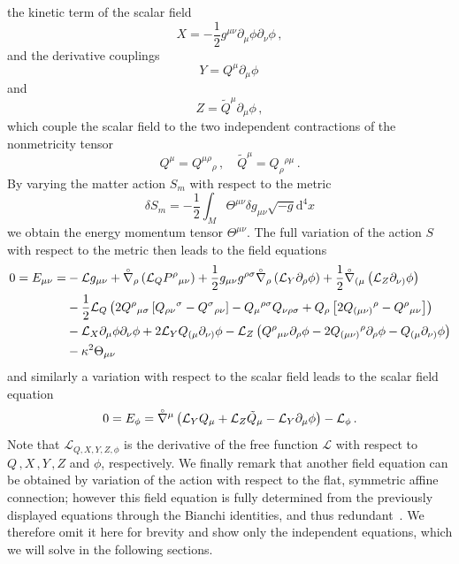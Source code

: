\documentclass[notitlepage,a4paper,aps,prd,onecolumn,superscriptaddress,nofootinbib,groupedaddress,longbibliography]{revtex4-2}
\newcommand{\lc}[1]{\accentset{\circ}{#1}}
\newcommand{\dd}{\mathrm{d}}
\newcommand{\mL}{\mathcal{L}}
\begin{document}
the kinetic term of the scalar field
\begin{equation}
    X=-\frac{1}{2}g^{\mu\nu}\partial_{\mu}\phi\partial_{\nu}\phi\,,
\end{equation}
and the derivative couplings
\begin{equation}
    Y=Q^{\mu}\partial_{\mu}\phi\,
\end{equation}
and
\begin{equation}
    Z=\tilde{Q}^{\mu}\partial_{\mu}\phi\,,
\end{equation}
which couple the scalar field to the two independent contractions of the nonmetricity tensor
\begin{equation}
Q^{\mu}=Q^{\mu\rho}{}_{\rho}\,,\quad \tilde{Q}^{\mu}=Q_{\rho}{}^{\rho\mu}\,.
\end{equation}
By varying the matter action $S_m$ with respect to the metric
\begin{equation}
\delta S_m=-\frac{1}{2}\int_M\Theta^{\mu\nu}\delta g_{\mu\nu}\sqrt{-g}\dd^4x
\end{equation}
we obtain the energy momentum tensor $\Theta^{\mu\nu}$. The full variation of the action $S$ with respect to the metric then leads to the field equations
\begin{align}
   0=E_{\mu\nu}=&-\mathcal{L}g_{\mu\nu}+\lc{\nabla}_{\rho}\left(\mathcal{L}_QP^{\rho}{}_{\mu\nu}\right)+\frac{1}{2}g_{\mu\nu}g^{\rho\sigma}\lc{\nabla}_{\rho}\left(\mathcal{L}_Y\partial_{\rho}\phi\right)+\frac{1}{2}\lc{\nabla}_{(\mu}\left(\mathcal{L}_Z\partial_{\nu)}\phi\right)\nonumber\\
    &-\frac{1}{2}\mathcal{L}_Q\left(2Q^{\rho}{}_{\mu\sigma}\left[Q_{\rho\nu}{}^{\sigma}-Q^{\sigma}{}_{\rho\nu}\right]-Q_{\mu}{}^{\rho\sigma}Q_{\nu\rho\sigma}+Q_{\rho}\left[2Q_{(\mu\nu)}{}^{\rho}-Q^{\rho}{}_{\mu\nu}\right]\right)\nonumber\\
    &-\mathcal{L}_X\partial_{\mu}\phi\partial_{\nu}\phi+2\mathcal{L}_YQ_{(\mu}\partial_{\nu)}\phi-\mathcal{L}_Z\left(Q^{\rho}{}_{\mu\nu}\partial_{\rho}\phi-2Q_{(\mu\nu)}{}^{\rho}\partial_{\rho}\phi-Q_{(\mu}\partial_{\nu)}\phi\right)\nonumber\\
    &-\kappa^2\Theta_{\mu\nu}\,
\end{align}
and similarly a variation with respect to the scalar field leads to the scalar field equation
\begin{equation}
    0 = E_{\phi}=\lc{\nabla}^{\mu}\left(\mathcal{L}_YQ_{\mu}+\mathcal{L}_Z\tilde{Q}_{\mu}-\mathcal{L}_Y\partial_{\mu}\phi\right)-\mathcal{L}_{\phi}\,.
\end{equation}
Note that $\mL_{Q,X,Y,Z,\phi}$ is the derivative of the free function $\mL$ with respect to $Q \,,X\,, Y\,, Z$ and $\phi$, respectively. We finally remark that another field equation can be obtained by variation of the action with respect to the flat, symmetric affine connection; however this field equation is fully determined from the previously displayed equations through the Bianchi identities, and thus redundant~\cite{Hohmann:2021fpr}. We therefore omit it here for brevity and show only the independent equations, which we will solve in the following sections.
\end{document}
